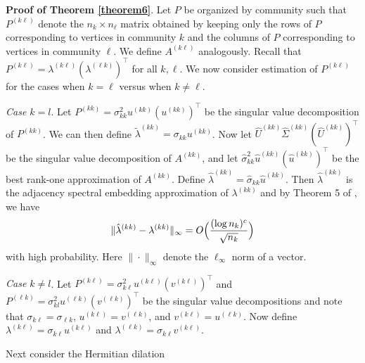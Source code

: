 \documentclass[12pt]{article}
\begin{document}
\textbf{Proof of Theorem \ref{theorem6}}. Let \(P\) be
organized by community such that \(P^{(k \ell)}\) denote the $n_k \times
n_{\ell}$ matrix obtained by keeping only the rows of $P$
corresponding to vertices in community $k$ and the columns of $P$
corresponding to vertices in community $\ell$. We define $A^{(k
  \ell)}$ analogously. Recall that $P^{(k \ell)} = \lambda^{(k \ell)} (\lambda^{(\ell k)})^{\top}$ for all $k, \ell$. We now consider estimation of $P^{(k \ell)}$
for the cases when $k = \ell$ versus when $k \not = \ell$.

\emph{Case \(k = l\)}. Let $P^{(kk)} =
\sigma_{kk}^2 u^{(kk)} (u^{(kk)})^\top$ be the singular value
decomposition of $P^{(kk)}$. We can then define
$\tilde{\lambda}^{(kk)} = \sigma_{kk} u^{(kk)}$. 
Now let $\hat{U}^{(kk)} \hat{\Sigma}^{(kk)} (\hat{U}^{(kk)})^\top$ be the
singular value decomposition of \(A^{(kk)}\), and let
$\hat{\sigma}_{kk}^2 \hat{u}^{(kk)} (\hat{u}^{(kk)})^\top$ be the
best rank-one approximation of $A^{(kk)}$. Define
\(\hat{\lambda}^{(kk)} = \hat{\sigma}_{kk} \hat{u}^{(kk)}\). Then
\(\hat{\lambda}^{(kk)}\) is the adjacency spectral embedding approximation of \(\lambda^{(kk)}\)
and by Theorem 5 of \citeauthor{rubindelanchy2017statistical}, we have
$$\|\hat{\lambda}^{(kk)} - \lambda^{(kk)}\|_{\infty} = O\Bigl(\frac{(\log n_k)^c}{\sqrt{n_k}}\Bigr)$$
with high probability. 
Here $\|\cdot\|_{\infty}$ denote the $\ell_{\infty}$ norm of a vector.

\emph{Case \(k \neq l\)}. %
Let \(P^{(k \ell)} = \sigma_{k \ell}^2 u^{(k \ell)} (v^{(k \ell)})^\top\) and 
\(P^{(\ell k)} = \sigma_{kl}^2 u^{(\ell k)} (v^{(\ell k)})^\top\)  be the singular
value decompositions and note that \(\sigma_{k \ell} = \sigma_{\ell
  k}\), \(u^{(k \ell)} = v^{(\ell k)}\), and
\(v^{(k \ell)} = u^{(\ell k)}\). 
Now define \(\lambda^{(k \ell)} = \sigma_{k \ell} u^{(k \ell)}\) and
\(\lambda^{(\ell k)} = \sigma_{k \ell}
v^{(k \ell)}\).

Next consider the Hermitian dilation
\end{document}

